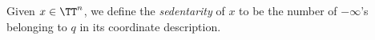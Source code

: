 

    Given $x\in \TT^n$, we define the \emph{sedentarity} of $x$ to be the number of $-\infty$'s belonging to $q$ in its coordinate description. 

